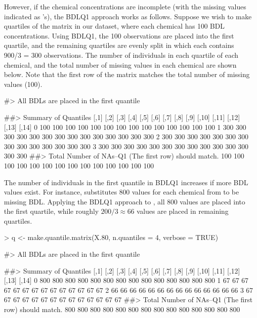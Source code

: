 However, if the chemical concentrations are incomplete (with the missing
values indicated as 's), the BDLQ1 approach works as follows.
Suppose we wish to make quartiles of the  matrix in our
dataset, where each chemical has 100 BDL concentrations. Using BDLQ1,
the 100 observations are placed into the first quartile, and the
remaining quartiles are evenly split in which each contains 900/3 = 300
observations. The number of individuals in each quartile of each
chemical, and the total number of missing values in each chemical are
shown below. Note that the first row of the matrix matches the total
number of missing values (100).

\begin{Schunk}
\begin{Soutput}
#> All BDLs are placed in the first quantile
\end{Soutput}
\begin{Soutput}
##> Summary of Quantiles 
  [,1] [,2] [,3] [,4] [,5] [,6] [,7] [,8] [,9] [,10] [,11] [,12] [,13] [,14]
0  100  100  100  100  100  100  100  100  100   100   100   100   100   100
1  300  300  300  300  300  300  300  300  300   300   300   300   300   300
2  300  300  300  300  300  300  300  300  300   300   300   300   300   300
3  300  300  300  300  300  300  300  300  300   300   300   300   300   300
##> Total Number of NAs--Q1 (The first row) should match.
100 100 100 100 100 100 100 100 100 100 100 100 100 100
\end{Soutput}
\end{Schunk}

The number of individuals in the first quantile in BDLQ1 increases if
more BDL values exist. For instance,  substitutes 800 values
for each chemical from  to be missing BDL.
Applying the BDLQ1 approach to , all 800 values are placed
into the first quartile, while roughly \(200/3 \approx 66\) values are
placed in remaining quartiles.

\begin{Schunk}
\begin{Sinput}
> q <- make.quantile.matrix(X.80, n.quantiles = 4, verbose = TRUE)
\end{Sinput}
\begin{Soutput}
#> All BDLs are placed in the first quantile
\end{Soutput}
\begin{Soutput}
##> Summary of Quantiles 
  [,1] [,2] [,3] [,4] [,5] [,6] [,7] [,8] [,9] [,10] [,11] [,12] [,13] [,14]
0  800  800  800  800  800  800  800  800  800   800   800   800   800   800
1   67   67   67   67   67   67   67   67   67    67    67    67    67    67
2   66   66   66   66   66   66   66   66   66    66    66    66    66    66
3   67   67   67   67   67   67   67   67   67    67    67    67    67    67
##> Total Number of NAs--Q1 (The first row) should match.
800 800 800 800 800 800 800 800 800 800 800 800 800 800
\end{Soutput}
\end{Schunk}

